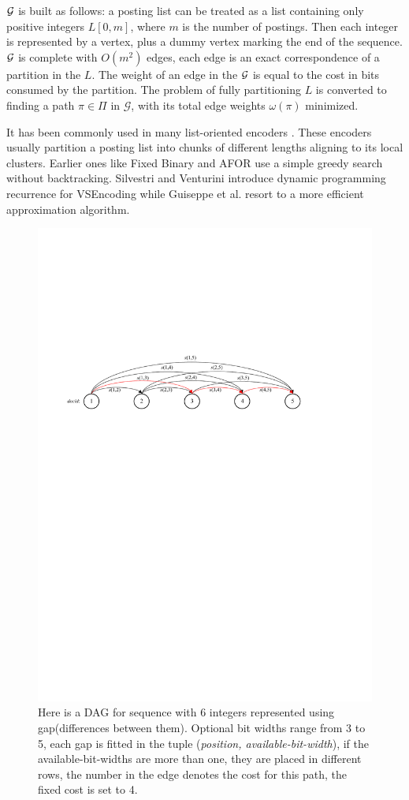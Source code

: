 \documentclass{sig-alternate-05-2015}
\begin{document}
$ \cal G $ is built as follows: a posting list can be treated as a list containing only positive integers $ L[0,m] $, where $ m $ is the number of postings.
Then each integer is represented by a vertex, plus a dummy vertex marking the end of the sequence.
$ \cal G $ is complete with $ O(m^2) $ edges, each edge is an exact correspondence of a partition in the $ L $.
The weight of an edge in the $ \cal G $ is equal to the cost in bits consumed by the partition.
The problem of fully partitioning $ L $ is converted to finding a path $\pi \in \Pi $ in $\mathcal{G}$, with its total edge weights $ \omega(\pi) $ minimized.

It has been commonly used in many list-oriented encoders \cite{song2016optimizing}.
These encoders usually partition a posting list into chunks of different lengths aligning to its local clusters.
Earlier ones like Fixed Binary \cite{anh2004index} and AFOR \cite{delbru2010adaptive} use a simple greedy search without backtracking.
Silvestri and Venturini introduce dynamic programming recurrence for VSEncoding \cite{silvestri2010vsencoding} while Guiseppe et al. resort to a more efficient approximation algorithm.

\begin{figure}
	\centering
	\includegraphics[width=0.9\linewidth]{sssp}
	\caption[sssp]{Here is a DAG for sequence with 6 integers represented using gap(differences between them). Optional bit widths range from 3 to 5, each gap is fitted in the tuple (\textit{position, available-bit-width}), if the available-bit-widths are more than one, they are placed in different rows, the number in the edge denotes the cost for this path, the fixed cost is set to 4.}
	\label{fig:sssp}
\end{figure}
\end{document}
